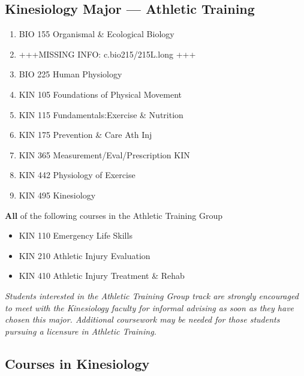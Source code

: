 \documentclass[
  letterpaper,
]{scrbook}
\providecommand{\tightlist}{%
  \setlength{\itemsep}{0pt}\setlength{\parskip}{0pt}}
\begin{document}
\subsection{Kinesiology Major --- Athletic
Training}\label{kinesiology-major-athletic-training}

\begin{enumerate}
\def\labelenumi{\arabic{enumi}.}
\tightlist
\item
  BIO 155 Organismal \& Ecological Biology
\item
  +++MISSING INFO: c.bio215/215L.long +++
\item
  BIO 225 Human Physiology
\item
  KIN 105 Foundations of Physical Movement
\item
  KIN 115 Fundamentals:Exercise \& Nutrition
\item
  KIN 175 Prevention \& Care Ath Inj
\item
  KIN 365 Measurement/Eval/Prescription KIN
\item
  KIN 442 Physiology of Exercise
\item
  KIN 495 Kinesiology
\end{enumerate}

\textbf{All} of the following courses in the Athletic Training Group

\begin{itemize}
\tightlist
\item
  KIN 110 Emergency Life Skills
\item
  KIN 210 Athletic Injury Evaluation
\item
  KIN 410 Athletic Injury Treatment \& Rehab
\end{itemize}

\emph{Students interested in the Athletic Training Group track are
strongly encouraged to meet with the Kinesiology faculty for informal
advising as soon as they have chosen this major. Additional coursework
may be needed for those students pursuing a licensure in Athletic
Training. }

\subsection{Courses in Kinesiology}\label{courses-in-kinesiology}
\end{document}
